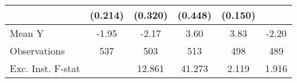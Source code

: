 {\begin{tabular}{l*{5}{c}}
            &     (0.214)         &     (0.320)         &     (0.448)         &     (0.150)         &                     \\
\midrule
Mean Y      &       -1.95         &       -2.17         &        3.60         &        3.83         &       -2.20         \\
Observations&         537         &         503         &         513         &         498         &         489         \\
Exc. Inst. F-stat&                     &      12.861         &      41.273         &       2.119         &       1.916         \\
\bottomrule
\end{tabular}
}
